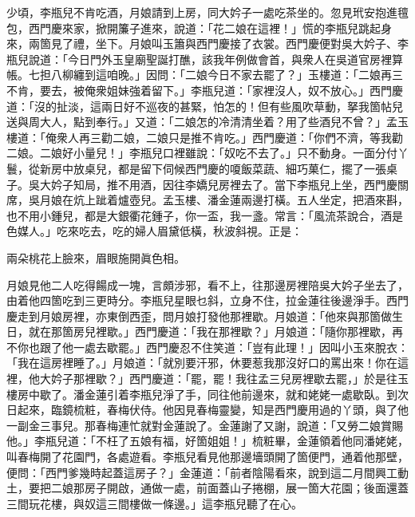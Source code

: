 少頃，李瓶兒不肯吃酒，月娘請到上房，同大妗子一處吃茶坐的。忽見玳安抱進氊包，西門慶來家，掀開簾子進來，說道：「花二娘在這裡！」慌的李瓶兒跳起身來，兩箇見了禮，坐下。月娘叫玉簫與西門慶接了衣裳。西門慶便對吳大妗子、李瓶兒說道：「今日門外玉皇廟聖誕打醮，該我年例做會首，與衆人在吳道官房裡算帳。七担八柳纏到這咱晚。」因問：「二娘今日不家去罷了？」玉樓道：「二娘再三不肯，要去，被俺衆姐妹強着留下。」李瓶兒道：「家裡沒人，奴不放心。」西門慶道：「沒的扯淡，這兩日好不巡夜的甚緊，怕怎的！但有些風吹草動，拏我箇帖兒送與周大人，點到奉行。」又道：「二娘怎的冷清清坐着？{}{}用了些酒兒不曾？」孟玉樓道：「俺衆人再三勸二娘，二娘只是推不肯吃。」西門慶道：「你們不濟，等我勸二娘。二娘好小量兒！」{}李瓶兒口裡雖說：「奴吃不去了。」只不動身。一面分付丫鬟，從新房中放桌兒，都是留下伺候西門慶的嗄飯菜蔬、細巧菓仁，擺了一張桌子。吳大妗子知局，推不用酒，因往李嬌兒房裡去了。{}當下李瓶兒上坐，西門慶關席，吳月娘在炕上跐着爐壺兒。{}孟玉樓、潘金蓮兩邊打橫。五人坐定，把酒來斟，也不用小鍾兒，都是大銀衢花鍾子，你一盃，我一盞。常言：「風流茶說合，酒是色媒人。」吃來吃去，吃的婦人眉黛低橫，秋波斜視。{}正是：

\begin{myquote}
兩朵桃花上臉來，眉眼施開眞色相。
\end{myquote}

月娘見他二人吃得餳成一塊，言頗涉邪，看不上，{}往那邊房裡陪吳大妗子坐去了，由着他四箇吃到三更時分。李瓶兒星眼乜斜，立身不住，拉金蓮往後邊淨手。西門慶走到月娘房裡，亦東倒西歪，問月娘打發他那裡歇。月娘道：「他來與那箇做生日，就在那箇房兒裡歇。」西門慶道：「我在那裡歇？」{}月娘道：「隨你那裡歇，再不你也跟了他一處去歇罷。」西門慶忍不住笑道：「豈有此理！」因叫小玉來脫衣：「我在這房裡睡了。」{}月娘道：「就別要汗邪，休要惹我那沒好口的罵出來！你在這裡，他大妗子那裡歇？」西門慶道：「罷，罷！{}我往孟三兒房裡歇去罷，」於是往玉樓房中歇了。潘金蓮引着李瓶兒淨了手，同往他前邊來，就和姥姥一處歇臥。到次日起來，臨鏡梳粧，春梅伏侍。他因見春梅靈變，知是西門慶用過的丫頭，與了他一副金三事兒。{}那春梅連忙就對金蓮說了。金蓮謝了又謝，說道：「又勞二娘賞賜他。」李瓶兒道：「不枉了五娘有福，好箇姐姐！」梳粧畢，金蓮領着他同潘姥姥，叫春梅開了花園門，各處遊看。李瓶兒看見他那邊墻頭開了箇便門，通着他那壁，便問：「西門爹幾時起蓋這房子？」金蓮道：「前者陰陽看來，說到這二月間興工動土，要把二娘那房子開啟，通做一處，前面蓋山子捲棚，展一箇大花園；後面還蓋三間玩花樓，與奴這三間樓做一條邊。」這李瓶兒聽了在心。

